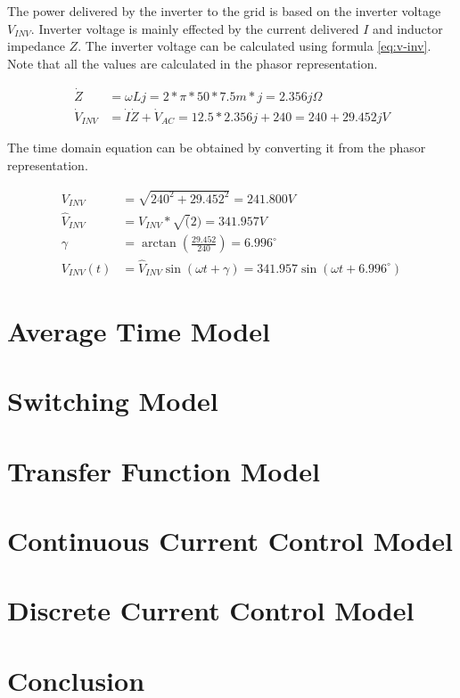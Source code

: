 \documentclass[12pt]{article}
\begin{document}
The power delivered by the inverter to the grid is based on the inverter voltage $V_{INV}$.
Inverter voltage is mainly effected by the current delivered $I$ and inductor impedance $Z$.
The inverter voltage can be calculated using formula \ref{eq:v-inv}.
Note that all the values are calculated in the phasor representation.

\begin{equation} \label{eq:v-inv}
    \begin{aligned}
        \dot{Z}       & = \omega{L}j = 2 * \pi * 50 * 7.5m * j = 2.356j \Omega                   \\
        \dot{V}_{INV} & = \dot{I} \dot{Z} + \dot{V}_{AC} = 12.5 * 2.356j + 240 = 240 + 29.452j V
    \end{aligned}
\end{equation}

The time domain equation can be obtained by converting it from the phasor representation.

\begin{equation}
    \begin{aligned}
        V_{INV}       & = \sqrt{240^2 + 29.452^2} = 241.800 V                                                  \\
        \hat{V}_{INV} & = V_{INV} * \sqrt(2) = 341.957 V                                                       \\
        \gamma        & = \arctan(\frac{29.452}{240}) = 6.996^{\circ{}}                                        \\
        V_{INV}(t)    & = \hat{V}_{INV} \sin(\omega{t} + \gamma{}) = 341.957 \sin(\omega{t} + 6.996^{\circ{}})
    \end{aligned}
\end{equation}

\section{Average Time Model}

\section{Switching Model}

\section{Transfer Function Model}

\section{Continuous Current Control Model}

\section{Discrete Current Control Model}

\section{Conclusion}
\end{document}
